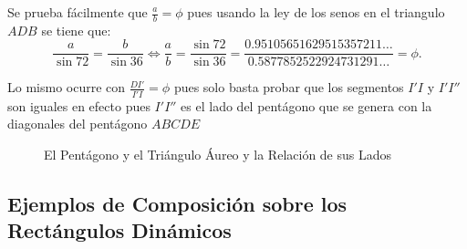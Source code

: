 Se prueba fácilmente que $\frac{a}{b}=\phi$ pues usando la ley de los senos en el triangulo $ADB$ se tiene que: $$\frac{a}{\sin72}=\frac{b}{\sin36}\Longleftrightarrow \frac{a}{b}=\frac{\sin72}{\sin36}=\frac{0.95105651629515357211\ldots}{0.5877852522924731291\ldots}=\phi.$$

Lo mismo ocurre con $\frac{DI'}{I'I}=\phi$ pues solo basta probar que los segmentos $I'I$ y $I'I''$ son iguales en efecto pues $I'I''$ es el lado del pentágono que se genera con la diagonales del pentágono $ABCDE$


\begin{figure}[!ht]
	\begin{center}

	\end{center}

	\caption{El Pentágono y el Triángulo Áureo y la Relación de sus Lados}\label{R}
\end{figure}


\subsection{Ejemplos de Composición sobre los Rectángulos Dinámicos}


